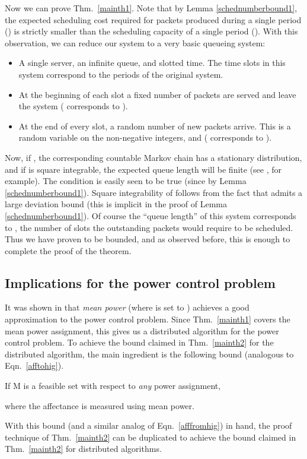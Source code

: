 \documentclass[11pt]{amsart}
\begin{document}
Now we can prove Thm.~\ref{mainth1}. 
Note that by
Lemma \ref{schednumberbound1}, the expected scheduling cost required for packets produced
during a single period () is strictly smaller than the scheduling capacity of a single period ().
With this observation, we can reduce our system to a very basic queueing system:

\begin{itemize}
\item A single server, an infinite queue, and slotted time. The time slots in this system correspond to the periods of the original system.
\item At the beginning of each slot a fixed number  of packets are served and leave the system ( corresponds to ).
\item At the end of every slot, a random number of new packets arrive. This is a random variable  on the  non-negative
integers, and  ( corresponds to ).
\end{itemize}
Now, if , the corresponding countable Markov chain has a stationary distribution, and if  is square integrable,
the expected queue length will be finite (see \cite{Asmussen}, for example). The condition  is easily seen to be true 
(since  by Lemma \ref{schednumberbound1}). Square integrability of 
 follows from the fact that  admits a large deviation bound (this
is implicit in the proof of Lemma \ref{schednumberbound1}). Of course the ``queue length'' of this system 
corresponds to , the number of slots the outstanding packets would require to be scheduled. 
Thus we have proven   to be bounded, and as observed before, this is enough to complete the proof of the theorem.

\subsection{Implications for the power control problem}

It was shown
in \cite{DBLP:conf/esa/Halldorsson09,SODA11} that
\emph{mean power} (where  is set to ) achieves a
good approximation to the power control problem. Since
Thm.~\ref{mainth1} covers the mean power assignment, this gives us a
 distributed algorithm for the power control problem. To
achieve the bound claimed in Thm.~\ref{mainth2} for the distributed
algorithm, the main ingredient is the following bound (analogous to
Eqn.~\ref{afftohig}).

\begin{lemma}
If M is a feasible set with respect to \emph{any} power assignment,

where the affectance  is measured using mean power.
\end{lemma}
With this bound (and a similar analog of Eqn.~\ref{afffromhig}) in hand, the proof technique of Thm.~\ref{mainth2}
can be duplicated to achieve the bound claimed in Thm.~\ref{mainth2} for distributed algorithms.
\end{document}
